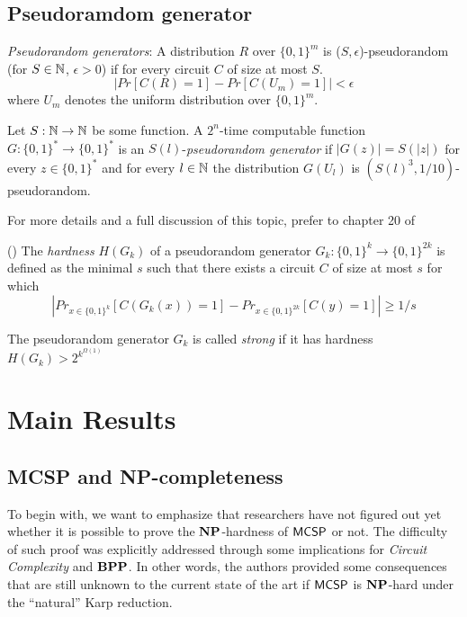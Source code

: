 \documentclass[11pt]{article}
\begin{document}


\subsection{Pseudoramdom generator}
\label{subsect:pseudorandom}
\begin{definition}
	\textit{Pseudorandom generators}: A distribution $R$ over $\{0, 1\}^m$ is ($S, \epsilon$)-pseudorandom (for $S \in {\mathbb{N}}$, $\epsilon > 0$) if for every circuit $C$ of size at most $S$.
	\[|Pr[C(R) = 1] - Pr[C(U_m) = 1]| < \epsilon\]
	where $U_m$ denotes the uniform distribution over $\{0, 1\}^m$.
	
	Let $S: {\mathbb{N}} \rightarrow {\mathbb{N}}$ be some function. A $2^n$-time computable function $G: \{0, 1\}^* \rightarrow \{0, 1\}^*$ is an $S(l)$-\textit{pseudorandom generator} if $|G(z)| = S(|z|)$ for every $z \in \{0, 1\}^*$ and for every $l \in {\mathbb{N}}$ the distribution $G(U_l)$ is $(S(l)^3, 1/10)$-pseudorandom.
	
	For more details and a full discussion of this topic, prefer to chapter 20 of \cite{arora2009}
\end{definition}

\begin{definition} (\cite{10.1145/335305.335314})
	The \textit{hardness} $H(G_k)$ of a pseudorandom generator $G_k: \{0, 1\}^k \rightarrow \{0, 1\}^{2k}$ is defined as the minimal $s$ such that there exists a circuit $C$ of size at most $s$ for which
	\[|Pr_{x \in \{0, 1\}^k}[C(G_k(x)) = 1] - Pr_{x \in \{0, 1\}^{2k}}[C(y) = 1]| \geq 1/s\]
	
	The pseudorandom generator $G_k$ is called \textit{strong} if it has hardness $H(G_k) > 2^{k^{\Omega(1)}}$ 
\end{definition}

\section{Main Results}

\subsection{MCSP and NP-completeness}
\label{subsect:MCSP-NP}

To begin with, we want to emphasize that researchers have not figured out yet whether it is possible to prove the $\mathbf{NP}$-hardness of $\mathsf{MCSP}$ or not. The difficulty of such proof was explicitly addressed through some implications for \textit{Circuit Complexity} and $\mathbf{BPP}$. In other words, the authors provided some consequences that are still unknown to the current state of the art if $\mathsf{MCSP}$ is $\mathbf{NP}$-hard under the ``natural'' Karp reduction. 
\end{document}
